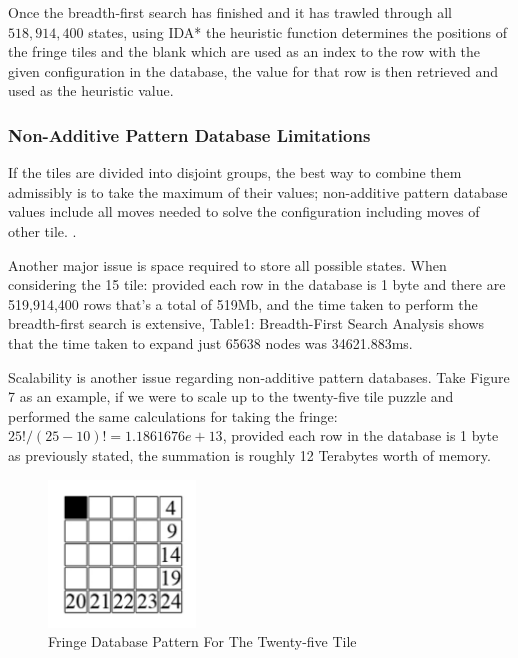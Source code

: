 \documentclass[final]{cmpreport}
\begin{document}
Once the breadth-first search has finished and it has trawled through all $518,914,400$ states, using IDA* the heuristic function determines the positions of the fringe tiles and the blank which are used as an index to the row with the given configuration in the database, the value for that row is then retrieved and used as the heuristic value.

\subsubsection{Non-Additive Pattern Database Limitations}
If the tiles are divided into disjoint groups, the best way to combine them admissibly is to take the maximum of their values; non-additive pattern database values include all moves needed to solve the configuration including moves of other tile. \citep{DBLP:journals/corr/abs-1107-0050}.

Another major issue is space required to store all possible states. When considering the 15 tile: provided each row in the database is 1 byte and there are 519,914,400 rows that's a total of 519Mb, and the time taken to perform the breadth-first search is extensive, Table1: Breadth-First Search Analysis shows that the time taken to expand just 65638 nodes was 34621.883ms.

Scalability is another issue regarding non-additive pattern databases. Take Figure 7 as an example, if we were to scale up to the twenty-five tile puzzle and performed the same calculations for taking the fringe: $25!/(25-10)!=1.1861676e+13$, provided each row in the database is 1 byte as previously stated, the summation is roughly 12 Terabytes worth of memory.



\begin{figure}[ht]
	\centering
	\includegraphics[width=0.35\textwidth]{fringe15}
	\captionsetup{justification=centering}
	\caption{Fringe Database Pattern For The Twenty-five Tile}
\end{figure}
\end{document}
